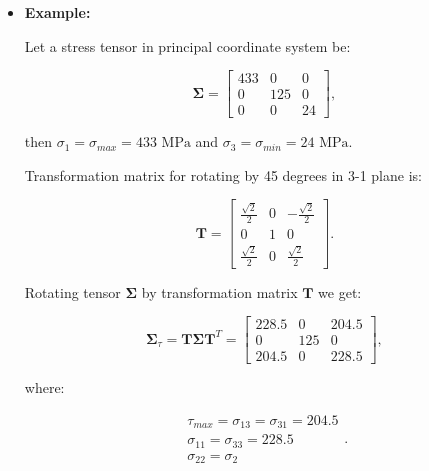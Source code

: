 \begin{itemize}
\begin{bbox}[0.85]
        \end{bbox}

    \item \textbf{Example:}

        Let a stress tensor in principal coordinate system be:

        \begin{equation}
             \mathbf{\Sigma} = \begin{bmatrix}
                 433 & 0 & 0 \\
                 0 & 125 & 0 \\
                 0 & 0 & 24
             \end{bmatrix}
        ,\end{equation}

        then $\sigma_1 = \sigma_{max} = 433 \text{ MPa}$ and
        $\sigma_3 = \sigma_{min} = 24 \text{ MPa}$.

        Transformation matrix for rotating by 45 degrees in 3-1 plane is:

        \begin{equation}
            \mathbf{T} = \begin{bmatrix}
                \frac{\sqrt{2}}{2} & 0 & -\frac{\sqrt{2}}{2} \\
                0 & 1 & 0 \\
                \frac{\sqrt{2}}{2} & 0 & \frac{\sqrt{2}}{2}
            \end{bmatrix}
        .\end{equation}

        Rotating tensor $\mathbf{\Sigma}$ by transformation matrix $\mathbf{T}$ we get:

        \begin{equation}
            \mathbf{\Sigma}_{\tau} = \mathbf{T}\mathbf{\Sigma}\mathbf{T}^{T}
            = \begin{bmatrix}
                228.5 & 0 & 204.5 \\
                0 & 125 & 0 \\
                204.5 & 0 & 228.5
            \end{bmatrix}
        ,\end{equation}

        where:

        \begin{equation}
            \begin{array}{l}
                \tau_{max} = \sigma_{13} = \sigma_{31} = 204.5 \\
                \sigma_{11} = \sigma_{33} = 228.5 \\
                \sigma_{22} = \sigma_2
            \end{array}
        .\end{equation}


\end{itemize}
